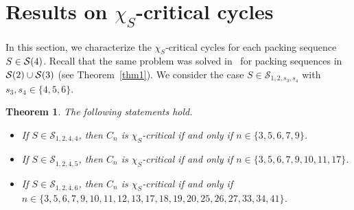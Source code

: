 \documentclass[12pt]{article}
\newtheorem{theorem}{Theorem}[section]
\newcommand{\cS}{{\cal S}}
\begin{document}
\section{Results on $\chi_S$-critical cycles} \label{sec:cycles}

In this section, we characterize the $\chi_S$-critical cycles for each packing sequence $S \in \cS(4)$. Recall that the same problem was solved in~\cite{ekinci-2026} for packing sequences in $\cS(2) \cup \cS(3)$  (see Theorem~\ref{thm1}). 
We consider the case $S \in \mathcal S_{1,2,s_3,s_4}$ with $s_3,s_4 \in \{4,5,6\}$.
\begin{theorem} \label{thm-4.1}
The following statements hold.

    \begin{itemize} 
    \item[$(i)$] If $S \in \mathcal{S}_{1,2,4,4}$, then $C_n$ is $\chi_S$-critical if and only if $n \in \{3, 5, 6, 7, 9\}$.

        
    \item[$(ii)$] If $S \in \mathcal{S}_{1,2,\overline{4},5}$, then $C_n$ is $\chi_S$-critical if and only if $n \in \{3, 5, 6, 7, 9, 10, 11,\allowbreak 17\}$.
\item[$(iii)$] If $S \in \mathcal{S}_{1,2,\overline{4},6}$, then $C_n$ is $\chi_S$-critical if and only if $n \in \{3, 5, 6, 7, 9, 10, 11,\allowbreak 12, 13, 17, 18, 19, 20, 25, 26, 27, 33, 34, 41\}$.        
    \end{itemize}
\end{theorem}
\end{document}
